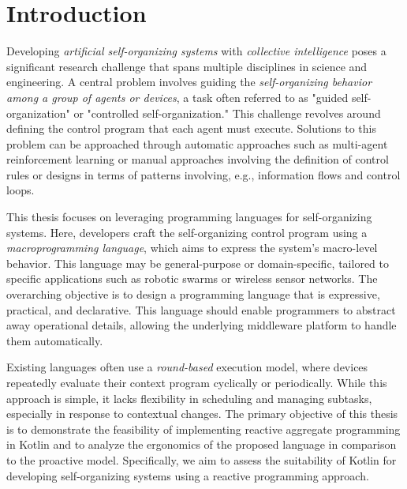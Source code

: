 
\chapter{Introduction}
\label{chap:introduction}

Developing \textit{artificial self-organizing systems} with \textit{collective intelligence} poses a significant research challenge that spans multiple disciplines in science and engineering. A central problem involves guiding the \textit{self-organizing behavior among a group of agents or devices}, a task often referred to as "guided self-organization" or "controlled self-organization." This challenge revolves around defining the control program that each agent must execute. Solutions to this problem can be approached through automatic approaches such as multi-agent reinforcement learning or manual approaches involving the definition of control rules or designs in terms of patterns
involving, e.g., information flows and control loops.

This thesis focuses on leveraging programming languages for self-organizing systems. Here, developers craft the self-organizing control program using a \textit{macroprogramming language}, which aims to express the system's macro-level behavior. This language may be general-purpose or domain-specific, tailored to specific applications such as robotic swarms or wireless sensor networks. The overarching objective is to design a programming language that is expressive, practical, and declarative. This language should enable programmers to abstract away operational details, allowing the underlying middleware platform to handle them automatically.

Existing languages often use a \textit{round-based} execution model, where devices repeatedly evaluate their context program cyclically or periodically. While this approach is simple, it lacks flexibility in scheduling and managing subtasks, especially in response to contextual changes. The primary objective of this thesis is to demonstrate the feasibility of implementing reactive aggregate programming in Kotlin and to analyze the ergonomics of the proposed language in comparison to the proactive model. Specifically, we aim to assess the suitability of Kotlin for developing self-organizing systems using a reactive programming approach.

